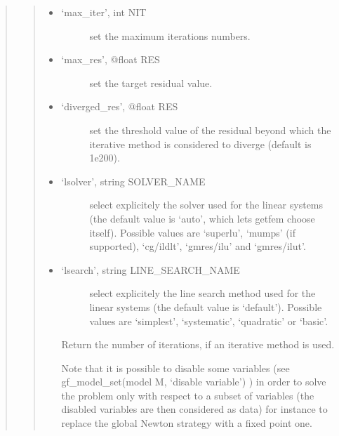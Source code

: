 \documentclass[a4paper,11pt,english]{sphinxmanual}
\begin{document}
\begin{quote}
\begin{quote}
\begin{itemize}
\begin{description}
\end{description}

\item {} \begin{description}
\item[{‘max\_iter’, int NIT}] \leavevmode
\sphinxAtStartPar
set the maximum iterations numbers.

\end{description}

\item {} \begin{description}
\item[{‘max\_res’, @float RES}] \leavevmode
\sphinxAtStartPar
set the target residual value.

\end{description}

\item {} \begin{description}
\item[{‘diverged\_res’, @float RES}] \leavevmode
\sphinxAtStartPar
set the threshold value of the residual beyond which the iterative
method is considered to diverge (default is 1e200).

\end{description}

\item {} \begin{description}
\item[{‘lsolver’, string SOLVER\_NAME}] \leavevmode
\sphinxAtStartPar
select explicitely the solver used for the linear systems (the
default value is ‘auto’, which lets getfem choose itself).
Possible values are ‘superlu’, ‘mumps’ (if supported),
‘cg/ildlt’, ‘gmres/ilu’ and ‘gmres/ilut’.

\end{description}

\item {} \begin{description}
\item[{‘lsearch’, string LINE\_SEARCH\_NAME}] \leavevmode
\sphinxAtStartPar
select explicitely the line search method used for the linear systems (the
default value is ‘default’).
Possible values are ‘simplest’, ‘systematic’, ‘quadratic’ or ‘basic’.

\end{description}

\sphinxAtStartPar
Return the number of iterations, if an iterative method is used.

\sphinxAtStartPar
Note that it is possible to disable some variables
(see gf\_model\_set(model M, ‘disable variable’) ) in order to
solve the problem only with respect to a subset of variables (the
disabled variables are then considered as data) for instance to
replace the global Newton strategy with a fixed point one.


\end{itemize}
\end{quote}
\end{quote}
\end{document}
